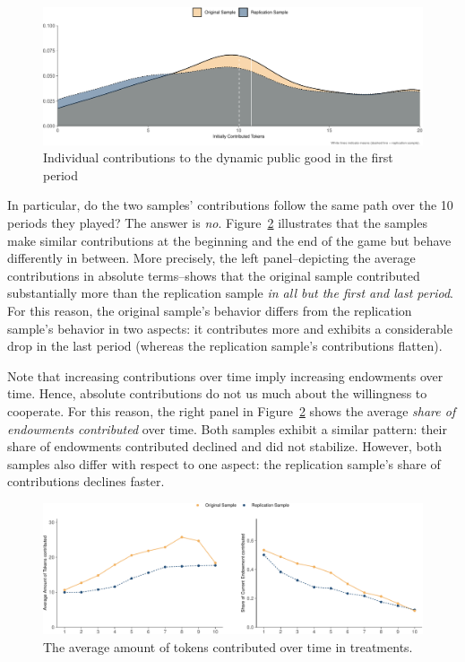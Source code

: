 \documentclass[
  authoryear,
  preprint,
  3p]{elsarticle}
\begin{document}
\begin{figure}

{\centering \includegraphics{paper_files/figure-pdf/fig-first-round-1.pdf}

}

\caption{\label{fig-first-round}Individual contributions to the dynamic
public good in the first period}

\end{figure}

In particular, do the two samples' contributions follow the same path
over the 10 periods they played? The answer is \emph{no}.
Figure~\ref{fig-share-of-contributions} illustrates that the samples
make similar contributions at the beginning and the end of the game but
behave differently in between. More precisely, the left panel--depicting
the average contributions in absolute terms--shows that the original
sample contributed substantially more than the replication sample
\emph{in all but the first and last period}. For this reason, the
original sample's behavior differs from the replication sample's
behavior in two aspects: it contributes more and exhibits a considerable
drop in the last period (whereas the replication sample's contributions
flatten).

Note that increasing contributions over time imply increasing endowments
over time. Hence, absolute contributions do not us much about the
willingness to cooperate. For this reason, the right panel in
Figure~\ref{fig-share-of-contributions} shows the average \emph{share of
endowments contributed} over time. Both samples exhibit a similar
pattern: their share of endowments contributed declined and did not
stabilize. However, both samples also differ with respect to one aspect:
the replication sample's share of contributions declines faster.

\begin{figure}

{\centering \includegraphics{paper_files/figure-pdf/fig-share-of-contributions-1.pdf}

}

\caption{\label{fig-share-of-contributions}The average amount of tokens
contributed over time in treatments.}

\end{figure}
\end{document}
